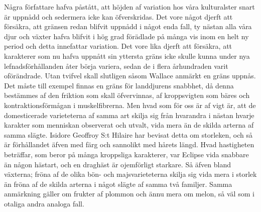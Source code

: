 Några författare hafva påstått, att höjden af variation hos våra kulturalster snart är uppnådd och sedermera icke kan öfverskridas. Det vore något djerft att försäkra, att gränsen redan blifvit uppnådd i något enda fall, ty nästan alla våra djur och växter hafva blifvit i hög grad förädlade på många vis inom en helt ny period och detta innefattar variation. Det vore lika djerft att försäkra, att karakterer som nu hafva uppnått sin yttersta gräns icke skulle kunna under nya lefnadsförhållanden åter börja variera, sedan de i flera århundraden varit oförändrade. Utan tvifvel skall slutligen såsom Wallace anmärkt en gräns uppnås. Det måste till exempel finnas en gräns för landdjurens snabbhet, då denna bestämmes af den friktion som skall öfvervinnas, af kroppsvigten som bäres och kontraktionsförmågan i muskelfibrerna. Men hvad som för oss är af vigt är, att de domesticerade varieteterna af samma art skilja sig från hvarandra i nästan hvarje karakter som menniskan observerat och utvalt, vida mera än de skilda arterna af samma slägte. Isidore Geoffroy S:t Hilaire har bevisat detta om storleken, och så är förhållandet äfven med färg och sannolikt med hårets längd. Hvad hastigheten beträffar, som beror på många kroppsliga karakterer, var Eclipse vida snabbare än någon hästart, och en draghäst är ojemförligt starkare. Så äfven bland växterna; fröna af de olika bön- och majsvarieteterna skilja sig vida mera i storlek än fröna af de skilda arterna i något slägte af samma två familjer. Samma anmärkning gäller om frukter af plommon och ännu mera om melon, så väl som i otaliga andra analoga fall.

